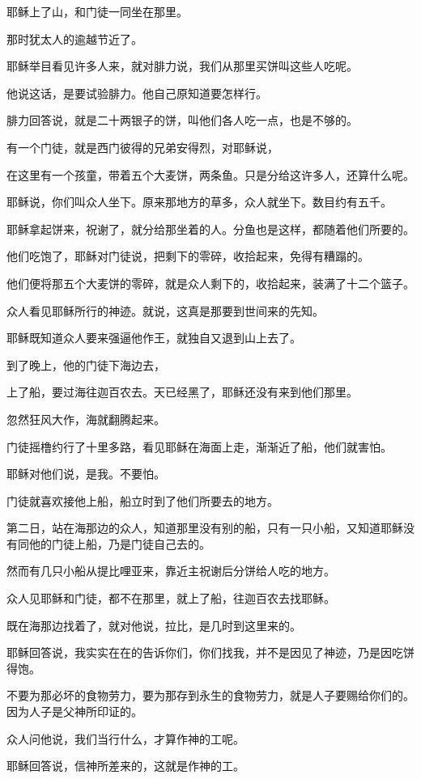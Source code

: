 \documentclass[12pt,oneside]{book}
\begin{document}
耶稣上了山，和门徒一同坐在那里。

那时犹太人的逾越节近了。

耶稣举目看见许多人来，就对腓力说，我们从那里买饼叫这些人吃呢。

他说这话，是要试验腓力。他自己原知道要怎样行。

腓力回答说，就是二十两银子的饼，叫他们各人吃一点，也是不够的。

有一个门徒，就是西门彼得的兄弟安得烈，对耶稣说，

在这里有一个孩童，带着五个大麦饼，两条鱼。只是分给这许多人，还算什么呢。

耶稣说，你们叫众人坐下。原来那地方的草多，众人就坐下。数目约有五千。

耶稣拿起饼来，祝谢了，就分给那坐着的人。分鱼也是这样，都随着他们所要的。

他们吃饱了，耶稣对门徒说，把剩下的零碎，收拾起来，免得有糟蹋的。

他们便将那五个大麦饼的零碎，就是众人剩下的，收拾起来，装满了十二个篮子。

众人看见耶稣所行的神迹。就说，这真是那要到世间来的先知。

耶稣既知道众人要来强逼他作王，就独自又退到山上去了。

到了晚上，他的门徒下海边去，

上了船，要过海往迦百农去。天已经黑了，耶稣还没有来到他们那里。

忽然狂风大作，海就翻腾起来。

门徒摇橹约行了十里多路，看见耶稣在海面上走，渐渐近了船，他们就害怕。

耶稣对他们说，是我。不要怕。

门徒就喜欢接他上船，船立时到了他们所要去的地方。

第二日，站在海那边的众人，知道那里没有别的船，只有一只小船，又知道耶稣没有同他的门徒上船，乃是门徒自己去的。

然而有几只小船从提比哩亚来，靠近主祝谢后分饼给人吃的地方。

众人见耶稣和门徒，都不在那里，就上了船，往迦百农去找耶稣。

既在海那边找着了，就对他说，拉比，是几时到这里来的。

耶稣回答说，我实实在在的告诉你们，你们找我，并不是因见了神迹，乃是因吃饼得饱。

不要为那必坏的食物劳力，要为那存到永生的食物劳力，就是人子要赐给你们的。因为人子是父神所印证的。

众人问他说，我们当行什么，才算作神的工呢。

耶稣回答说，信神所差来的，这就是作神的工。
\end{document}

